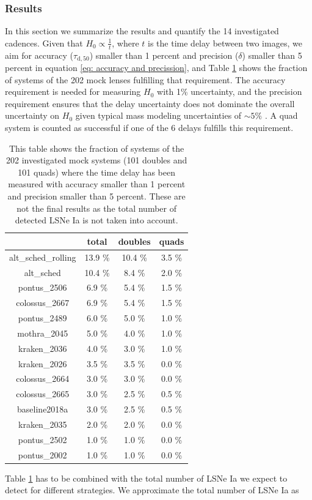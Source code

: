 \subsubsection{Results}
\label{sec:results}
In this section we summarize the results and quantify the 14
investigated cadences. Given that $H_0 \propto \frac{1}{t}$, where $t$
is the time delay between two images, we aim for accuracy
($\tau_\mathrm{d,50}$) smaller than 1 percent and precision ($\delta$)
smaller than 5 percent in equation \ref{eq: accuracy and precission},
and Table \ref{tab: fraction of systems} shows the fraction of systems
of the 202 mock lenses fulfilling that requirement. The accuracy
requirement is needed for measuring $H_0$ with 1\% uncertainty, and
the precision requirement ensures that the delay uncertainty does not
dominate the overall uncertainty on $H_0$ given typical mass modeling
uncertainties of $\sim 5\%$ \citep[e.g.,][]{Suyu2018}.  A quad system is counted as successful if one of the 6 delays fulfills this requirement.\\
%
\begin{table}
\centering
\begin{tabular}{c|c|c|c}
&total& doubles & quads \\
\hline
alt\_sched\_rolling & 13.9 \% & 10.4 \% &3.5 \% \\
\hline
alt\_sched & 10.4 \% & 8.4 \% & 2.0 \% \\
\hline
pontus\_2506 & 6.9 \% & 5.4 \% &1.5 \% \\
\hline
colossus\_2667 & 6.9 \% & 5.4 \% &1.5 \% \\
\hline
pontus\_2489 & 6.0 \% & 5.0 \% &1.0 \% \\
\hline
mothra\_2045 & 5.0 \% & 4.0 \% &1.0 \% \\
\hline
kraken\_2036 & 4.0 \% & 3.0 \% &1.0 \% \\
\hline
kraken\_2026 & 3.5 \% & 3.5 \% &0.0 \% \\
\hline
colossus\_2664 & 3.0 \% & 3.0 \% &0.0 \% \\
\hline
colossus\_2665 & 3.0 \% & 2.5 \% &0.5 \% \\
\hline
baseline2018a & 3.0 \% & 2.5 \% &0.5 \% \\
\hline
kraken\_2035 & 2.0 \% & 2.0 \% &0.0 \% \\
\hline
pontus\_2502 & 1.0 \% & 1.0 \% &0.0 \% \\
\hline
pontus\_2002 & 1.0 \% & 1.0 \% &0.0 \% \\
\end{tabular}
\caption{This table shows the fraction of systems of the 202 investigated mock systems (101 doubles and 101 quads) where the time delay has been measured with accuracy smaller than 1 percent and precision smaller than 5 percent. These are not the final results as the total number of detected LSNe Ia is not taken into account. }
\label{tab: fraction of systems}
\end{table}
Table \ref{tab: fraction of systems} has to be combined with the total number of LSNe Ia we expect to detect for different strategies. We approximate the total number of LSNe Ia as


